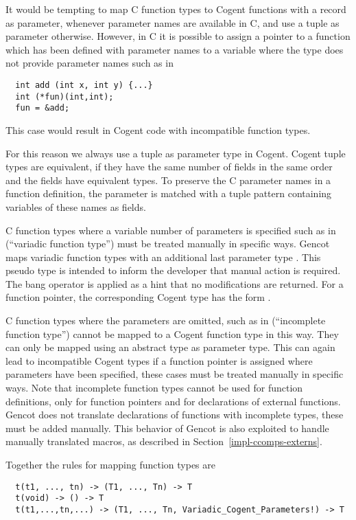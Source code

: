 It would be tempting to map C function types to Cogent functions with a record as parameter, whenever parameter 
names are available in C, and use a tuple as parameter otherwise. However, in C it is possible to assign a 
pointer to a function which has been defined 
with parameter names to a variable where the type does not provide parameter names such as in 
\begin{verbatim}
  int add (int x, int y) {...}
  int (*fun)(int,int);
  fun = &add;
\end{verbatim}
This case would result in Cogent code with incompatible function types.

For this reason we always use a tuple as parameter type in Cogent. Cogent tuple types are equivalent, if they
have the same number of fields in the same order and the fields have equivalent types. To preserve the C parameter names in 
a function definition, the parameter is matched with a tuple pattern containing variables of these
names as fields.

C function types where a variable number of
parameters is specified such as in  (``variadic function type'') must 
be treated manually in specific ways. Gencot maps variadic function types
with an additional last parameter type . This pseudo type is intended 
to inform the developer that manual action is required. The bang operator is applied as a hint
that no modifications are returned. For a function pointer, the corresponding Cogent type has
the form .

C function types where the parameters are omitted, such as in  (``incomplete function type'') 
cannot be mapped to a Cogent function type in this way. 
They can only be mapped using an abstract type as parameter type. This can again lead to incompatible 
Cogent types if a function pointer is assigned where parameters have been specified, these cases must 
be treated manually in specific ways. Note that incomplete function types cannot be used for function
definitions, only for function pointers and for declarations of external functions. 
Gencot does not translate declarations of functions with incomplete types, these must be added manually.
This behavior of Gencot is also exploited to handle manually translated macros, as described in 
Section~\ref{impl-ccomps-externs}.

Together the rules for mapping function types are
\begin{verbatim}
  t(t1, ..., tn) -> (T1, ..., Tn) -> T
  t(void) -> () -> T
  t(t1,...,tn,...) -> (T1, ..., Tn, Variadic_Cogent_Parameters!) -> T
\end{verbatim}

